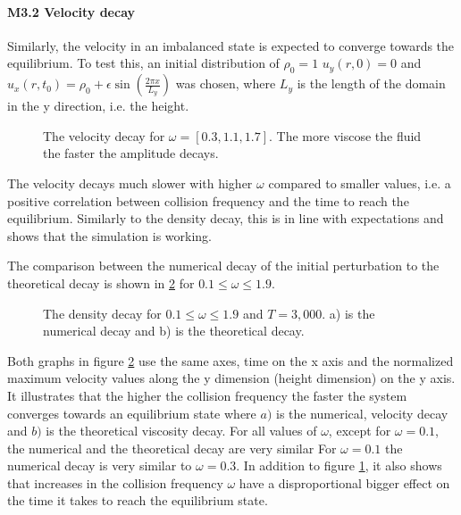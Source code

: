 \documentclass[a4paper,12pt, oneside]{book}
\begin{document}
\paragraph{M3.2 Velocity decay}
Similarly, the velocity in an imbalanced state is expected to converge towards the equilibrium.
To test this, an initial distribution of $\rho_{0}=1$ $u_{y}(r,0)=0$ and $u_{x}(r,t_{0})=\rho_{0}+\epsilon \sin \left( \frac{2\pi x}{L_{y}} \right)$ was chosen, where $L_{y}$ is the length of the domain in the y direction, i.e. the height.
\begin{figure}[ht]
\centering
\resizebox{\columnwidth}{!}{\large}
\vspace*{-10mm}
\caption[Velocity decay]{The velocity decay for $\omega=[0.3,1.1,1.7]$. The more viscose the fluid the faster the amplitude decays.}
\label{fig:m3-2-vel}
\end{figure}
The velocity decays much slower with higher $\omega$ compared to smaller values, i.e. a positive correlation between collision frequency and the time to reach the equilibrium.
Similarly to the density decay, this is in line with expectations and shows that the simulation is working.

The comparison between the numerical decay of the initial perturbation to the theoretical decay is shown in \ref{fig:m3-2-norm-vel} for $0.1 \leq \omega \leq 1.9 $.
\begin{figure}[ht]
\centering
\resizebox{\columnwidth}{!}{\large}
\vspace*{-10mm}
\caption[Normalized density decay]{The density decay for $0.1 \leq \omega \leq 1.9 $ and $T=3,000$. a) is the numerical decay and b) is the theoretical decay.}
\label{fig:m3-2-norm-vel}
\end{figure}
Both graphs in figure \ref{fig:m3-2-norm-vel} use the same axes, time on the x axis and the normalized maximum velocity values along the y dimension (height dimension) on the y axis.
It illustrates that the higher the collision frequency the faster the system converges towards an equilibrium state where $a)$ is the numerical, velocity decay and $b)$ is the theoretical viscosity decay.
For all values of $\omega$, except for $\omega=0.1$, the numerical and the theoretical decay are very similar
For $\omega=0.1$ the numerical decay is very similar to $\omega=0.3$.
In addition to figure \ref{fig:m3-2-vel}, it also shows that  increases in the collision frequency $\omega$ have a disproportional bigger effect on the time it takes to reach the equilibrium state.
\end{document}
